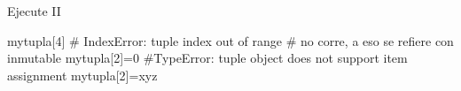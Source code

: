 \documentclass[
  ignorenonframetext,
  aspectratio=169,
  spanish,
]{beamer}
\newenvironment{Shaded}{\begin{snugshade}}{\end{snugshade}}
\newcommand{\CommentTok}[1]{\textcolor[rgb]{0.37,0.37,0.37}{#1}}
\newcommand{\DecValTok}[1]{\textcolor[rgb]{0.68,0.00,0.00}{#1}}
\newcommand{\NormalTok}[1]{\textcolor[rgb]{0.00,0.23,0.31}{#1}}
\newcommand{\OperatorTok}[1]{\textcolor[rgb]{0.37,0.37,0.37}{#1}}
\newcommand{\StringTok}[1]{\textcolor[rgb]{0.13,0.47,0.30}{#1}}
\begin{document}
\begin{frame}[fragile]{Ejecute II}
\label{ejecute-ii}
\begin{Shaded}
\begin{Highlighting}[]
\NormalTok{mytupla[}\DecValTok{4}\NormalTok{] }\CommentTok{\# IndexError: tuple index out of range}
\CommentTok{\# no corre, a eso se refiere con inmutable }
\NormalTok{mytupla[}\DecValTok{2}\NormalTok{]}\OperatorTok{=}\DecValTok{0} \CommentTok{\#TypeError: \textquotesingle{}tuple\textquotesingle{} object does not support item assignment}
\NormalTok{mytupla[}\DecValTok{2}\NormalTok{]}\OperatorTok{=}\StringTok{\textquotesingle{}xyz\textquotesingle{}}
\end{Highlighting}
\end{Shaded}
\end{frame}
\end{document}
